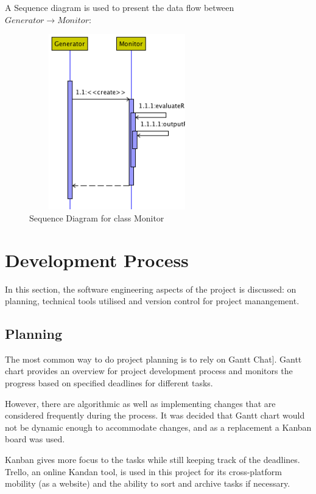 \begin{description}
A Sequence diagram is used to present the data flow between $Generator \rightarrow Monitor$:
\begin{figure}[h]
    \centering
    \includegraphics[width=3in, height=3in]{figures/sequence_monitor}
    \caption[Sequence Diagram for class Monitor]{Sequence Diagram for class Monitor}
    \label{fig:figure4_62}
\end{figure}

\end{description}

\section{Development Process}

In this section, the software engineering aspects of the project is discussed: on planning, technical tools utilised and version control for project manangement.

\subsection{Planning}

The most common way to do project planning is to rely on Gantt Chat]. Gantt chart provides an overview for project development process and monitors the progress based on specified deadlines for different tasks.

However, there are algorithmic as well as implementing changes that are considered frequently during the process. It was decided that Gantt chart would not be dynamic enough to accommodate changes, and as a replacement a Kanban board was used.

Kanban gives more focus to the tasks while still keeping track of the deadlines. Trello, an online Kandan tool, is used in this project for its cross-platform mobility (as a website) and the ability to sort and archive tasks if necessary.

